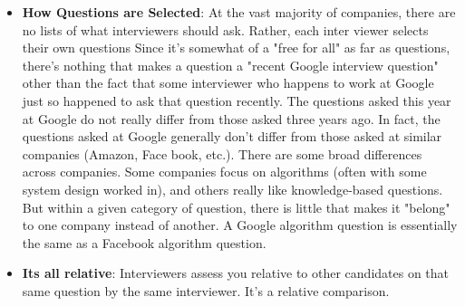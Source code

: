 \documentclass{report}
\begin{document}
\begin{itemize}
\begin{enumerate}
                \item \textbf{Whiteboards let you focus on what matters}: It's absolutely true that you'd struggle with writing perfect code on a whiteboard. Fortunately, your interviewer doesn't expect that. Virtually everyone has some bugs or minor syntactical errors. 
                    \bigbreak \noindent 
                    The nice thing about a whiteboard is that in some ways, you can focus on the big picture. You don't have a compiler. so you don't need to make your code compile. You don't need to write the entire class definition and boilerplate code. You get to focus on the interesting, "meaty" parts of the code: the function that the question is really all about.
                    \bigbreak \noindent 
                    That's not to say that you should just write pseudocode or that correctness doesn't matter. Most interviewers aren't okay with pseudocode, and fewer errors are better.
                    \bigbreak \noindent 
                    Whiteboards also tend to encourage candidates to speak more and explain their thought process. When a candidate is given a computer, their communication drops substantially
            \end{enumerate}
        \item \textbf{How Questions are Selected}: At the vast majority of companies, there are no lists of what interviewers should ask. Rather, each inter viewer selects their own questions 
            \bigbreak \noindent 
            Since it's somewhat of a "free for all" as far as questions, there's nothing that makes a question a "recent Google interview question" other than the fact that some interviewer who happens to work at Google just so happened to ask that question recently.
            \bigbreak \noindent 
            The questions asked this year at Google do not really differ from those asked three years ago. In fact, the questions asked at Google generally don't differ from those asked at similar companies (Amazon, Face book, etc.).
            \bigbreak \noindent 
            There are some broad differences across companies. Some companies focus on algorithms (often with some system design worked in), and others really like knowledge-based questions. But within a given category of question, there is little that makes it "belong" to one company instead of another. A Google algorithm question is essentially the same as a Facebook algorithm question. 
        \item \textbf{Its all relative}: Interviewers assess you relative to other candidates on that same question by the same interviewer. It's a relative comparison. 

\end{itemize}
\end{document}
